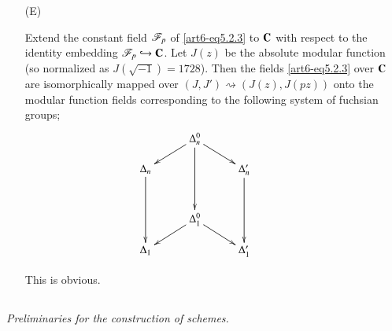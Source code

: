 \begin{itemize}
\begin{proof}
(i) is obvious. To check (ii), it suffices to show that $I^0 = I [J']$. Since $\sK^0_n = \sK_n [J']$, each $z \in \sK^0_n$ can be expressed as $z = \sum\limits^p_{i=0} a_i J'^i (a_i \in \sK_n)$. It suffices to show that ``$a_i \in I (0 \leqslant i \leqslant p)$ and $z \in p I^0$ imply $a_i \in p I (0 \leqslant i \leqslant p)$''. Suppose $a_i \in I (0 \leqslant i \leqslant p)$ and $z \in p I^0$. Then $z \equiv 0 (\mod \fB_n)$ gives $\sum\limits_i \bar{a}_i j^{pi} = 0$, and $z \equiv 0 (\mod \fB'_n)$  gives $\sum\limits_i \bar{a}_i^p j^i =0 $, where $\bar{a}_i$ is an element of $K_n$ reduced from $a_i$. Since $1, j, \ldots, j^{p-1}$ are linearly independent over $K^p_n$, we obtain $\bar{a}_i = 0 (1 \leqslant i \leqslant p -1)$ and $\bar{a}_0 + \bar{a}_p j^{p^2} = \bar{a}_p j = 0$. But $j$ being transcendental over $F_p$, we have $j^{p^2} \neq j$; hence also $\bar{a}_0 = \bar{a}_p = 0$.
\end{proof}

\item[(E)]
\setcounter{subprop}{7}
\begin{subprop}\label{art6-subprop5.2.8}
Extend the constant field $\mathscr{F}_p$ of \eqref{art6-eq5.2.3} to $\mathbf{C}$ with respect to the identity embedding $\mathscr{F}_p \hookrightarrow \mathbf{C}$. Let $J(z)$ be the absolute modular function (so normalized as $J (\sqrt{-1})= 1728$). Then the fields \eqref{art6-eq5.2.3} over $\mathbf{C}$ are isomorphically mapped over $(J, J') \rightsquigarrow (J(z), J(pz))$ onto the modular function fields corresponding to the following system of fuchsian groups;
$$
\xymatrix@R=0.4cm@C=1cm{
& \Delta^0_n \ar[dr] \ar[dl] \ar[ddd] & \\
\Delta_n \ar[ddd]&&  \Delta'_n \ar[ddd]\\
& & &\\
& \Delta^0_1 \ar[dr] \ar[dl]& \\
\Delta_1 & & \Delta'_1}
$$
\end{subprop}
This is obvious.
\end{itemize}

\subsection{}\label{subsec5.3}
\textit{Preliminaries for the construction of schemes.}

